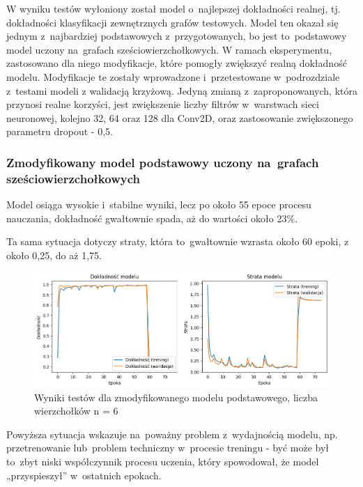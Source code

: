 W wyniku testów wyłoniony został model o~najlepszej dokładności realnej, tj.
dokładności klasyfikacji zewnętrznych grafów testowych.
Model ten okazał się jednym z~najbardziej podstawowych z~przygotowanych,
bo jest to~podstawowy model uczony na~grafach sześciowierzchołkowych.
W ramach eksperymentu, zastosowano dla niego modyfikacje,
które pomogły zwiększyć realną dokładność modelu.
Modyfikacje te zostały wprowadzone i~przetestowane w~podrozdziale z~testami modeli
z walidacją krzyżową.
Jedyną zmianą z~zaproponowanych, która przynosi realne korzyści,
jest zwiększenie liczby filtrów w~warstwach sieci neuronowej, kolejno 32, 64 oraz 128 dla Conv2D,
oraz zastosowanie zwiększonego parametru dropout - 0,5.

\subsubsection{Zmodyfikowany model podstawowy uczony na~grafach sześciowierzchołkowych}

Model osiąga wysokie i~stabilne wyniki, lecz po około 55 epoce procesu nauczania,
dokładność gwałtownie spada, aż do wartości około 23\%.

Ta sama sytuacja dotyczy straty, która to~gwałtownie wzrasta około 60 epoki,
z około 0,25, do aż 1,75.

\begin{figure}[ht]
	\centering
	\includegraphics[width=15.5cm]{resources/tests/images/v4/base6_1_img.png}
	\caption{Wyniki testów dla zmodyfikowanego modelu podstawowego, liczba wierzchołków n = 6}
	\label{Fig:tests-best-0a}
\end{figure}
\FloatBarrier

Powyższa sytuacja wskazuje na~poważny problem z~wydajnością modelu,
np. przetrenowanie lub~problem techniczny w~procesie treningu
- być może był to~zbyt niski współczynnik procesu uczenia,
który spowodował, że model „przyspieszył” w~ostatnich epokach.


